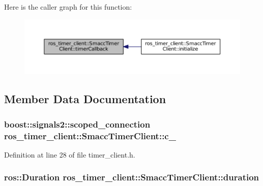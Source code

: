 Here is the caller graph for this function\+:
\nopagebreak
\begin{figure}[H]
\begin{center}
\leavevmode
\includegraphics[width=350pt]{classros__timer__client_1_1SmaccTimerClient_ab6a461bedfad7a1842d27249008cae4d_icgraph}
\end{center}
\end{figure}




\subsection{Member Data Documentation}
\subsubsection[{\texorpdfstring{c\+\_\+}{c_}}]{\setlength{\rightskip}{0pt plus 5cm}boost\+::signals2\+::scoped\+\_\+connection ros\+\_\+timer\+\_\+client\+::\+Smacc\+Timer\+Client\+::c\+\_\+}\hypertarget{classros__timer__client_1_1SmaccTimerClient_a71473af935673138cb1f93a16c8fe37f}{}\label{classros__timer__client_1_1SmaccTimerClient_a71473af935673138cb1f93a16c8fe37f}


Definition at line 28 of file timer\+\_\+client.\+h.

\subsubsection[{\texorpdfstring{duration}{duration}}]{\setlength{\rightskip}{0pt plus 5cm}ros\+::\+Duration ros\+\_\+timer\+\_\+client\+::\+Smacc\+Timer\+Client\+::duration\hspace{0.3cm}{\ttfamily [protected]}}\hypertarget{classros__timer__client_1_1SmaccTimerClient_afa4e91d5da885c59306d74c7b6e85052}{}\label{classros__timer__client_1_1SmaccTimerClient_afa4e91d5da885c59306d74c7b6e85052}


